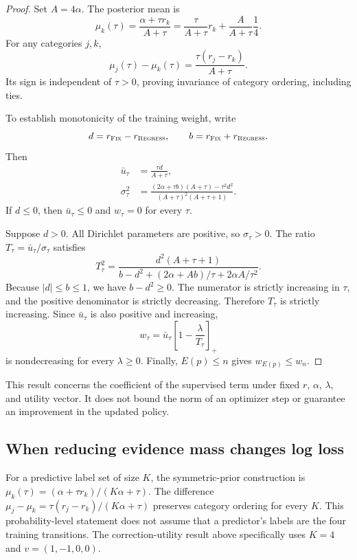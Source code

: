 \documentclass{article}
\newcommand{\fix}{\textsc{Fix}\xspace}
\newcommand{\regress}{\textsc{Regress}\xspace}
\begin{document}
\begin{proof}
Set $A=4\alpha$. The posterior mean is
\[
\mu_k(\tau)=\frac{\alpha+\tau r_k}{A+\tau}
=\frac{\tau}{A+\tau}r_k+\frac{A}{A+\tau}\frac14.
\]
For any categories $j,k$,
\[
\mu_j(\tau)-\mu_k(\tau)
=\frac{\tau(r_j-r_k)}{A+\tau}.
\]
Its sign is independent of $\tau>0$, proving invariance of category ordering, including ties.

To establish monotonicity of the training weight, write
\[
d=r_{\fix}-r_{\regress},
\qquad
b=r_{\fix}+r_{\regress}.
\]
Then
\begin{align}
\bar u_\tau&=\frac{\tau d}{A+\tau},\\
\sigma_\tau^2
&=\frac{(2\alpha+\tau b)(A+\tau)-\tau^2d^2}
{(A+\tau)^2(A+\tau+1)}.
\end{align}
If $d\le0$, then $\bar u_\tau\le0$ and $w_\tau=0$ for every $\tau$.

Suppose $d>0$. All Dirichlet parameters are positive, so $\sigma_\tau>0$. The ratio $T_\tau=\bar u_\tau/\sigma_\tau$ satisfies
\begin{equation}
T_\tau^2
=\frac{d^2(A+\tau+1)}
{b-d^2+(2\alpha+Ab)/\tau+2\alpha A/\tau^2}.
\label{eq:utility-snr}
\end{equation}
Because $|d|\le b\le1$, we have $b-d^2\ge0$. The numerator is strictly increasing in $\tau$, and the positive denominator is strictly decreasing. Therefore $T_\tau$ is strictly increasing. Since $\bar u_\tau$ is also positive and increasing,
\[
w_\tau
=\bar u_\tau\left[1-\frac{\lambda}{T_\tau}\right]_+
\]
is nondecreasing for every $\lambda\ge0$. Finally, $E(p)\le n$ gives $w_{E(p)}\le w_n$.
\end{proof}

This result concerns the coefficient of the supervised term under fixed $r$, $\alpha$, $\lambda$, and utility vector. It does not bound the norm of an optimizer step or guarantee an improvement in the updated policy.

\subsection{When reducing evidence mass changes log loss}
\label{app:logloss}

For a predictive label set of size $K$, the symmetric-prior construction is
$\mu_k(\tau)=(\alpha+\tau r_k)/(K\alpha+\tau)$.
The difference $\mu_j-\mu_k=\tau(r_j-r_k)/(K\alpha+\tau)$ preserves
category ordering for every $K$. This probability-level statement does
not assume that a predictor's labels are the four training transitions.
The correction-utility result above specifically uses $K=4$ and
$v=(1,-1,0,0)$.
\end{document}
